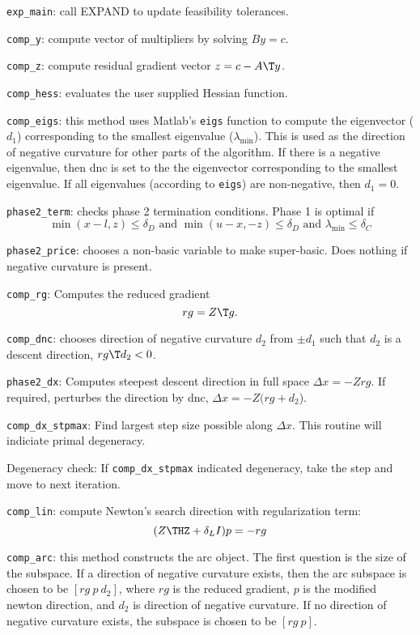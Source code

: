 \documentclass[11pt]{article}
\newcommand{\code}[1]{\texttt{#1}}
\begin{document}
\begin{description}
\item \code{exp\_main}: call EXPAND to update feasibility tolerances.
\item \code{comp\_y}: compute vector of multipliers by solving $By=c$.
\item \code{comp\_z}: compute residual gradient vector $z = c - A\T y$.
\item \code{comp\_hess}: evaluates the user supplied Hessian function.
\item \code{comp\_eigs}: this method uses Matlab's \code{eigs} function to
  compute the eigenvector ($d_1$) corresponding to the smallest eigenvalue
  ($\lambda_{\min}$).  This is used as the direction of negative curvature for
  other parts of the algorithm.  If there is a negative eigenvalue, then dnc is
  set to the the eigenvector corresponding to the smallest eigenvalue.  If all
  eigenvalues (according to \code{eigs}) are non-negative, then $d_1 = 0$.
\item \code{phase2\_term}: checks phase 2 termination conditions. Phase 1 is optimal if
\begin{equation*}
\min(x-l,z) \le \delta_D \text{ and } \min(u-x,-z) \le \delta_D \text{ and }
\lambda_{\min} \le \delta_C
\end{equation*}
\item \code{phase2\_price}: chooses a non-basic variable to make super-basic.
  Does nothing if negative curvature is present.
\item \code{comp\_rg}: Computes the reduced gradient
\begin{equation*}
rg = Z\T g.
\end{equation*}
\item \code{comp\_dnc}: chooses direction of negative curvature $d_2$ from $\pm
  d_1$ such that $d_2$ is a descent direction, $rg\T d_2 < 0$.
\item \code{phase2\_dx}: Computes steepest descent direction in full space
  $\Delta x = -Zrg$.  If required, perturbes the direction by dnc, $\Delta x =
  -Z(rg+d_2$).
\item \code{comp\_dx\_stpmax}: Find largest step size possible along $\Delta
  x$.  This routine will indiciate primal degeneracy.
\item Degeneracy check: If \code{comp\_dx\_stpmax} indicated degeneracy, take
  the step and move to next iteration.
\item \code{comp\_lin}: compute Newton's search direction with regularization term:
\begin{equation*}
(Z\THZ + \delta_LI)p = -rg
\end{equation*}
\item \code{comp\_arc}: this method constructs the arc object.  The first
  question is the size of the subspace.  If a direction of negative curvature
  exists, then the arc subspace is chosen to be $[rg\ p\ d_2]$, where $rg$ is
  the reduced gradient, $p$ is the modified newton direction, and $d_2$ is
  direction of negative curvature.  If no direction of negative curvature
  exists, the subspace is chosen to be $[rg\ p]$.


\end{description}
\end{document}
